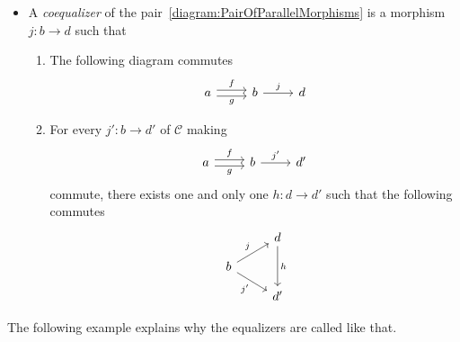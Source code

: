 \begin{definition}
\begin{itemize}[leftmargin=*]
\begin{enumerate}[leftmargin=*]
\[\begin{tikzcd}[row sep=small]
          & a \\
          c \ar["i", ur, swap]
        \end{tikzcd}
      \]
    \end{enumerate}
  \item A {\em coequalizer} of the
    pair~\eqref{diagram:PairOfParallelMorphisms} is a morphism
    \(j : b \to d\) such that
    \begin{enumerate}[leftmargin=*]
    \item The following diagram commutes
      \[
        \begin{tikzcd}
          a \ar["f", r, shift left] \ar["g", r, shift right, swap] & b
          \ar["j", r] & d
        \end{tikzcd}
      \]
    \item For every \(j' : b \to d'\) of \(\mathcal{C}\) making
      \[
        \begin{tikzcd}
          a \ar["f", r, shift left] \ar["g", r, shift right, swap] & b
          \ar["{j'}", r] & d'
        \end{tikzcd}
      \]
      commute, there exists one and only one \(h : d \to d'\) such that
      the following commutes
      \[
        \begin{tikzcd}[row sep=small]
          & d \ar["h", dd] \\
          b \ar["j", ur] \ar["{j'}", dr, swap] \\
          & d'
        \end{tikzcd}
      \]
    \end{enumerate}
  \end{itemize}
\end{definition}





The following example explains why the equalizers are called like
that.

